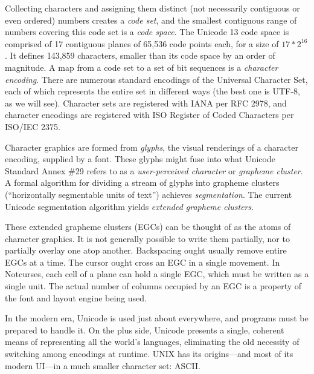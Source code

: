 \documentclass[letterpaper,10pt]{article}
\begin{document}
Collecting characters and assigning them distinct (not necessarily contiguous or
even ordered) numbers creates a \textit{code set}, and the smallest contiguous
range of numbers covering this code set is a \textit{code space}. The Unicode 13
code space is comprised of 17 contiguous planes of 65,536 code points each, for
a size of $17*2^{16}$. It defines 143,859 characters, smaller than its
code space by an order of magnitude. A map from a code set to a set of bit
sequences is a \textit{character encoding}. There are numerous standard
encodings of the Universal Character Set, each of which represents the entire
set in different ways (the best one is UTF-8, as we will see). Character sets
are registered with IANA per RFC 2978\cite{rfc2978}, and character encodings
are registered with ISO Register of Coded Characters per ISO/IEC
2375\cite{iso2375}.

Character graphics are formed from \textit{glyphs}, the visual renderings of a
character encoding, supplied by a font. These glyphs might fuse into what
Unicode Standard Annex \#29\cite{annex29} refers to as a \textit{user-perceived
character} or \textit{grapheme cluster}. A formal algorithm for dividing a
stream of glyphs into grapheme clusters (``horizontally segmentable units of
text\cite{meaningcodepoints}'') achieves \textit{segmentation}. The current
Unicode segmentation algorithm yields \textit{extended grapheme clusters}.

These extended grapheme clusters (EGCs) can be thought of as the atoms of
character graphics. It is not generally possible to write them partially, nor
to partially overlay one atop another. Backspacing ought usually remove entire EGCs
at a time. The cursor ought cross an EGC in a single movement. In Notcurses,
each cell of a plane can hold a single EGC, which must be written as a single
unit. The actual number of columns occupied by an EGC is a property of the font
and layout engine being used.

In the modern era, Unicode is used just about everywhere, and programs must be
prepared to handle it. On the plus side, Unicode presents a single, coherent
means of representing all the world's languages, eliminating the old necessity
of switching among encodings at runtime. UNIX has its origins---and most of its
modern UI---in a much smaller character set: ASCII.
\end{document}
